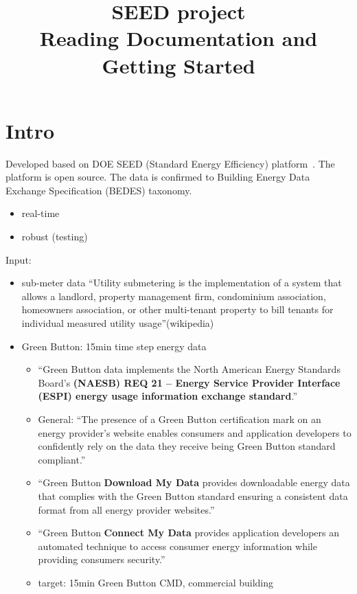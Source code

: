 \documentclass[hidelinks,12pt]{article}
\begin{document}
\title{SEED project\\
       \large Reading Documentation and Getting Started}
\maketitle
\tableofcontents
\newpage
\section{Intro}\label{sec:intro}
Developed based on DOE SEED (Standard Energy Efficiency)
platform~\cite{DOESeed2015}. The platform is open source. The data is
confirmed to Building Energy Data Exchange Specification (BEDES)
taxonomy. 
\begin{itemize}
\item real-time
\item robust (testing)
\end{itemize}

Input: 

\begin{itemize}
\item sub-meter data ``Utility submetering is the implementation of a
system that allows a landlord, property management firm, condominium
association, homeowners association, or other multi-tenant property to
bill tenants for individual measured utility usage''(wikipedia)

\item Green Button: 15min time step energy data 

  \begin{itemize}
  \item ``Green Button data implements the North American Energy
    Standards Board's \textbf{(NAESB) REQ 21 -- Energy Service Provider
    Interface (ESPI) energy usage information exchange standard}.''
    ~\cite{GreenButton2015}

  \item General: ``The presence of a Green Button certification mark
    on an energy provider's website enables consumers and application
    developers to confidently rely on the data they receive being
    Green Button standard compliant.''
  
  \item ``Green Button \textbf{Download My Data} provides downloadable
    energy data that complies with the Green Button standard ensuring
    a consistent data format from all energy provider websites.''
  
  \item ``Green Button \textbf{Connect My Data} provides application
    developers an automated technique to access consumer energy
    information while providing consumers security.''
  \item target: 15min Green Button CMD, commercial building

  \end{itemize}
\end{itemize}
\end{document}
